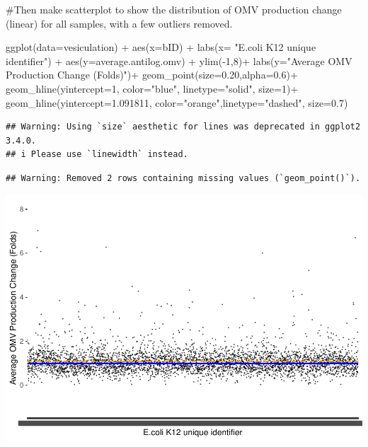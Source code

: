 \documentclass[
]{article}
\newenvironment{Shaded}{\begin{snugshade}}{\end{snugshade}}
\newcommand{\AttributeTok}[1]{\textcolor[rgb]{0.77,0.63,0.00}{#1}}
\newcommand{\DecValTok}[1]{\textcolor[rgb]{0.00,0.00,0.81}{#1}}
\newcommand{\FloatTok}[1]{\textcolor[rgb]{0.00,0.00,0.81}{#1}}
\newcommand{\FunctionTok}[1]{\textcolor[rgb]{0.00,0.00,0.00}{#1}}
\newcommand{\NormalTok}[1]{#1}
\newcommand{\SpecialCharTok}[1]{\textcolor[rgb]{0.00,0.00,0.00}{#1}}
\newcommand{\StringTok}[1]{\textcolor[rgb]{0.31,0.60,0.02}{#1}}
\begin{document}
\#Then make scatterplot to show the distribution of OMV production
change (linear) for all samples, with a few outliers removed.

\begin{Shaded}
\begin{Highlighting}[]
\FunctionTok{ggplot}\NormalTok{(}\AttributeTok{data=}\NormalTok{vesiculation) }\SpecialCharTok{+}
  \FunctionTok{aes}\NormalTok{(}\AttributeTok{x=}\NormalTok{bID) }\SpecialCharTok{+} 
  \FunctionTok{labs}\NormalTok{(}\AttributeTok{x=} \StringTok{"E.coli K12 unique identifier"}\NormalTok{) }\SpecialCharTok{+}
  \FunctionTok{aes}\NormalTok{(}\AttributeTok{y=}\NormalTok{average.antilog.omv) }\SpecialCharTok{+}
  \FunctionTok{ylim}\NormalTok{(}\SpecialCharTok{{-}}\DecValTok{1}\NormalTok{,}\DecValTok{8}\NormalTok{)}\SpecialCharTok{+}
  \FunctionTok{labs}\NormalTok{(}\AttributeTok{y=}\StringTok{"Average OMV Production Change (Folds)"}\NormalTok{)}\SpecialCharTok{+}
  \FunctionTok{geom\_point}\NormalTok{(}\AttributeTok{size=}\FloatTok{0.20}\NormalTok{,}\AttributeTok{alpha=}\FloatTok{0.6}\NormalTok{)}\SpecialCharTok{+}
  \FunctionTok{geom\_hline}\NormalTok{(}\AttributeTok{yintercept=}\DecValTok{1}\NormalTok{, }\AttributeTok{color=}\StringTok{"blue"}\NormalTok{, }\AttributeTok{linetype=}\StringTok{"solid"}\NormalTok{, }\AttributeTok{size=}\DecValTok{1}\NormalTok{)}\SpecialCharTok{+}
  \FunctionTok{geom\_hline}\NormalTok{(}\AttributeTok{yintercept=}\FloatTok{1.091811}\NormalTok{, }\AttributeTok{color=}\StringTok{"orange"}\NormalTok{,}\AttributeTok{linetype=}\StringTok{"dashed"}\NormalTok{, }\AttributeTok{size=}\FloatTok{0.7}\NormalTok{)}
\end{Highlighting}
\end{Shaded}

\begin{verbatim}
## Warning: Using `size` aesthetic for lines was deprecated in ggplot2 3.4.0.
## i Please use `linewidth` instead.
\end{verbatim}

\begin{verbatim}
## Warning: Removed 2 rows containing missing values (`geom_point()`).
\end{verbatim}

\includegraphics{OMV-analysis_files/figure-latex/figure1-1.pdf}
\end{document}

